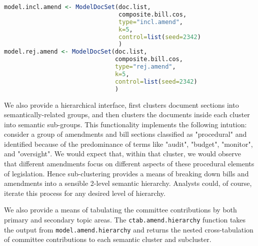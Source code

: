\documentclass[11pt]{article}
\begin{document}
\begin{lstlisting}[language=R, numbers=none]
model.incl.amend <- ModelDocSet(doc.list,
                                composite.bill.cos,
                                type="incl.amend",
                                k=5,
                                control=list(seed=2342)
                                )
model.rej.amend <- ModelDocSet(doc.list,
                               composite.bill.cos,
                               type="rej.amend",
                               k=5,
                               control=list(seed=2342)
                               )
\end{lstlisting}

We also provide a hierarchical interface, first clusters document
sections into semantically-related groups, and then clusters the
documents inside each cluster into semantic sub-groups. This
functionality implements the following intution: consider a group of
amendments and bill sections classified as "procedural" and identified
because of the predominance of terms like "audit", "budget",
"monitor", and "oversight". We would expect that, within that cluster,
we would observe that different amendments focus on different aspects
of these procedural elements of legislation. Hence sub-clustering
provides a means of breaking down bills and amendments into a sensible
2-level semantic hierarchy. Analysts could, of course, iterate this
process for any desired level of hierarchy. 

We also provide a means of tabulating the committee contributions by
both primary and secondary topic areas. The
\texttt{ctab.amend.hierarchy} function takes the output from
\texttt{model.amend.hierarchy} and returns the nested cross-tabulation
of committee contributions to each semantic cluster and subcluster. 
\end{document}
